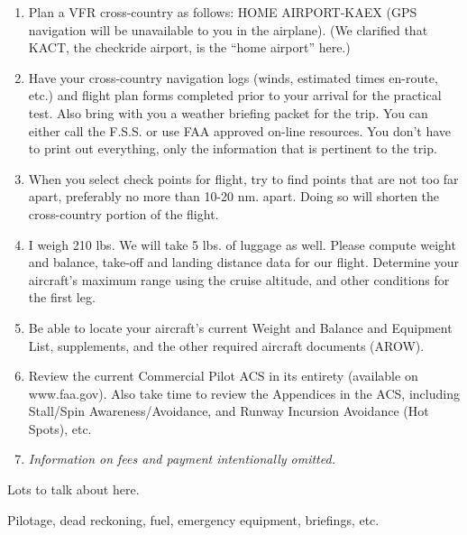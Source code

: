 \begin{enumerate}

\item Plan a VFR cross-country as follows: HOME AIRPORT-KAEX (GPS navigation will be unavailable to you in the airplane). (We clarified that KACT, the checkride airport, is the ``home airport'' here.)

\item Have your cross-country navigation logs (winds, estimated times en-route, etc.) and flight plan forms completed prior to your arrival for the practical test. Also bring with you a weather briefing packet for the trip. You can either call the F.S.S. or use FAA approved on-line resources. You don't have to print out everything, only the information that is pertinent to the trip.

\item When you select check points for flight, try to find points that are not too far apart, preferably no more than 10-20 nm. apart. Doing so will shorten the cross-country portion of the flight.

\item I weigh 210 lbs. We will take 5 lbs. of luggage as well. Please compute weight and balance, take-off and landing distance data for our flight. Determine your aircraft's maximum range using the cruise altitude, and other conditions for the first leg.

\item Be able to locate your aircraft's current Weight and Balance and Equipment List, supplements, and the other required aircraft documents (AROW).

\item Review the current Commercial Pilot ACS in its entirety (available on www.faa.gov). Also take time to review the Appendices in the ACS, including Stall/Spin Awareness/Avoidance, and Runway Incursion Avoidance (Hot Spots), etc.

\item \emph{Information on fees and payment intentionally omitted.}

\end{enumerate}

Lots to talk about here.

Pilotage, dead reckoning, fuel, emergency equipment, briefings, etc.


